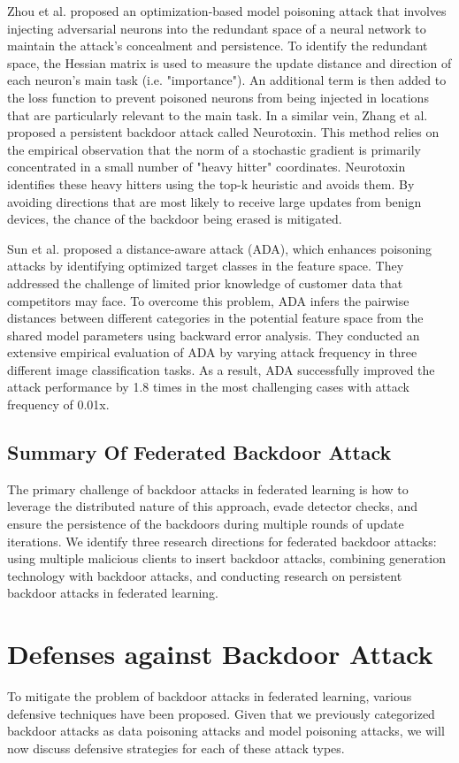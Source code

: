 \documentclass[conference]{IEEEtran}
\begin{document}
Zhou et al.\cite{b63} proposed an optimization-based model poisoning attack that
involves injecting adversarial neurons into the redundant space of a neural network
to maintain the attack's concealment and persistence. To identify the redundant
space, the Hessian matrix is used to measure the update distance and direction of each neuron's main task (i.e. "importance").
An additional term is then added to the loss function to prevent poisoned neurons from being injected
in locations that are particularly relevant to the main task.
In a similar vein, Zhang et al.\cite{b62}
proposed a persistent backdoor attack called Neurotoxin. This method
relies on the empirical observation that the norm of a stochastic gradient
is primarily concentrated in a small number of "heavy hitter" coordinates.
Neurotoxin identifies these heavy hitters using the top-k heuristic and
avoids them. By avoiding directions that are most likely to receive large
updates from benign devices, the chance of the backdoor being erased is mitigated.

Sun et al. \cite{b65}proposed a distance-aware attack (ADA), which enhances poisoning attacks
by identifying optimized target classes in the feature space. They addressed the challenge of
limited prior knowledge of customer data that competitors may face. To overcome this problem,
ADA infers the pairwise distances between different categories in the potential feature space
from the shared model parameters using backward error analysis. They conducted an extensive
empirical evaluation of ADA by varying attack frequency in three different image classification
tasks. As a result, ADA successfully improved the attack performance by 1.8 times in the most
challenging cases with attack frequency of 0.01x.

\subsection{Summary Of Federated Backdoor Attack}
The primary challenge of backdoor attacks in federated learning is how
to leverage the distributed nature of this approach, evade detector checks,
and ensure the persistence of the backdoors during multiple rounds of update
iterations. We identify three research directions for federated backdoor
attacks: using multiple malicious clients to insert backdoor attacks,
combining generation technology with backdoor attacks, and conducting
research on persistent backdoor attacks in federated learning.

\section{Defenses against Backdoor Attack}  
To mitigate the problem of backdoor attacks in 
federated learning, various defensive techniques have been proposed. 
Given that we previously categorized backdoor attacks as data poisoning 
attacks and model poisoning attacks, we will now discuss defensive strategies 
for each of these attack types.
\end{document}
